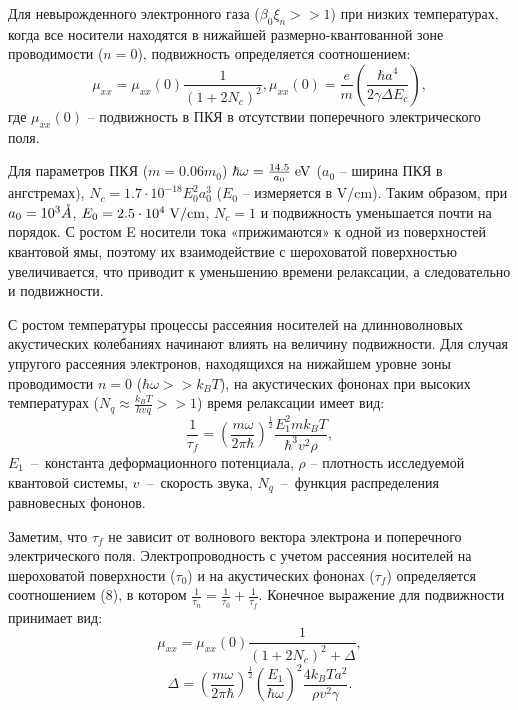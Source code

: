 Для невырожденного электронного газа ($\beta _{0} \xi _{n} >>1$) при низких температурах, когда все носители находятся в нижайшей размерно-квантованной зоне проводимости ($n=0$), подвижность определяется соотношением:
\begin{equation} \label{eq:41_90}
\mu _{xx} =\mu _{xx} (0)\frac{1}{\left(1+2N_{c} \right)^{2} } , \mu _{xx} (0)=\frac{e}{m} \left(\frac{\hbar a^{4} }{2\gamma \Delta E_{c} } \right),
\end{equation} 
где $\mu _{xx} (0)$ -- подвижность в ПКЯ в отсутствии поперечного электрического поля.

Для параметров ПКЯ ($m=0.06m_{0} $) $\hbar \omega =\frac{14.5}{a_{0} } {\rm \; eV}$ ($a_{0} $ -- ширина ПКЯ в ангстремах), $N_{c} =1.7\cdot 10^{-18} E_{0}^{2} a_{0}^{3} $ ($E_{0} $ -- измеряется в V/cm). Таким образом, при $a_{0} =10^{3} \AA$, $E_{0} =2.5\cdot 10^{4} {\rm \; V/cm}$, $N_{c} =1$ и подвижность уменьшается почти на порядок. С ростом E носители тока «прижимаются» к одной из поверхностей квантовой ямы, поэтому их взаимодействие с шероховатой поверхностью увеличивается, что приводит к уменьшению времени релаксации, а следовательно и подвижности.

С ростом температуры процессы рассеяния носителей на длинноволновых акустических колебаниях начинают влиять на величину подвижности. Для случая упругого рассеяния электронов, находящихся на нижайшем уровне зоны проводимости $n=0$ ($\hbar \omega >>k_{B} T$), на акустических фононах при высоких температурах ($N_{q} \approx \frac{k_{B} T}{hvq} >>1$) время релаксации имеет вид:
\begin{equation} \label{eq:41_100}
\frac{1}{\tau _{f} } =\left(\frac{m\omega }{2\pi \hbar } \right)^{\frac{1}{2} } \frac{E_{1}^{2} mk_{B} T}{\hbar ^{3} v^{2} \rho } , 
\end{equation} 
$E_{1} $~--~константа деформационного потенциала, $\rho $ -- плотность исследуемой квантовой системы, $v$~--~скорость звука, $N_{q} $~--~функция распределения равновесных фононов.

Заметим, что $\tau _{f} $ не зависит от волнового вектора электрона и поперечного электрического поля. Электропроводность с учетом рассеяния носителей на шероховатой поверхности ($\tau _{0} $) и на акустических фононах ($\tau _{f} $) определяется соотношением (8), в котором $\frac{1}{\tau _{n} } =\frac{1}{\tau _{0} } +\frac{1}{\tau _{f} } $. Конечное выражение для подвижности принимает вид:
\begin{equation} \label{eq:41_110}
\mu _{xx} =\mu _{xx} (0)\frac{1}{\left(1+2N_{c} \right)^{2} +\Delta } , 
\end{equation} 
\[
\Delta =\left(\frac{m\omega }{2\pi \hbar } \right)^{\frac{1}{2} } \left(\frac{E_{1} }{\hbar \omega } \right)^{2} \frac{4k_{B} Ta^{2} }{\rho v^{2} \gamma }. 
\] 

